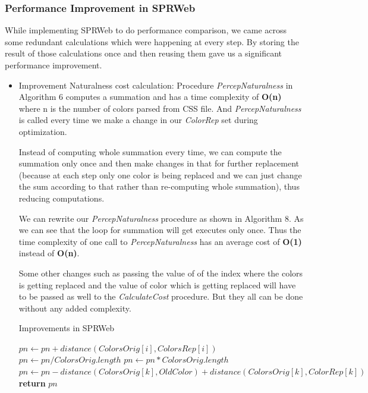 \subsubsection{Performance Improvement in SPRWeb}
\label{Improvement in SPRWeb}
While implementing SPRWeb to do performance comparison, we came across some redundant calculations which were happening at every step. By storing the result of those calculations once and then reusing them gave us a significant performance improvement.

\begin{itemize}
\item {Improvement Naturalness cost calculation:} Procedure \textit{PercepNaturalness} in Algorithm 6 computes a summation and has a time complexity of \textbf{O(n)} where n is the number of colors parsed from CSS file. And \textit{PercepNaturalness} is called every time we make a change in our \textit{ColorRep} set during optimization.

Instead of computing whole summation every time, we can compute the summation only once and then make changes in that for further replacement (because at each step only one color is being replaced and we can just change the sum according to that rather than re-computing whole summation), thus reducing computations.

We can rewrite our \textit{PercepNaturalness} procedure as shown in Algorithm 8. As we can see that the  loop for summation will get executes only once. Thus the time complexity of one call to \textit{PercepNaturalness} has an average cost of \textbf{O(1)} instead of \textbf{O(n)}.

Some other changes such as passing the value of of the index where the colors is getting replaced and the value of color which is getting replaced will have to be passed as well to the \textit{CalculateCost} procedure. But they all can be done without any added complexity. 

\begin{algorithm}[!htb]
\caption{Improvements in SPRWeb}\label{Improvements Naturalness}
\begin{algorithmic}[1]
 
  
			\State $pn \gets pn + distance(ColorsOrig[i],ColorsRep[i])$
		\EndFor
	\State $pn \gets pn/ColorsOrig.length$
\Else
\State $pn \gets pn*ColorsOrig.length$
\State $pn  \gets pn - distance(ColorsOrig[k],OldColor) + distance(ColorsOrig[k],ColorRep[k])$ 
\EndIf
\State \textbf{return} $pn$
\EndProcedure
\end{algorithmic}
\end{algorithm}


\end{itemize}
